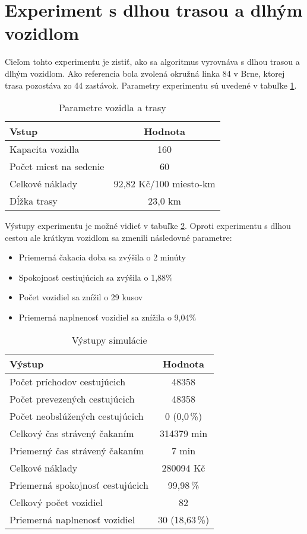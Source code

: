 \newpage
\section{Experiment s dlhou trasou a dlhým vozidlom}
Cieľom tohto experimentu je zistiť, ako sa algoritmus vyrovnáva s dlhou trasou a dlhým vozidlom.
Ako referencia bola zvolená okružná linka 84 v Brne, ktorej trasa pozostáva zo 44 zastávok.
Parametry experimentu sú uvedené v tabuľke \ref{tab:longDlongVin}.

\begin{table}[h]
  \centering
  \begin{tabular}{|l|c|}
    \hline
    \textbf{Vstup} & \textbf{Hodnota} \\ \hline
    Kapacita vozidla & 160 \\ \hline
    Počet miest na sedenie & 60 \\ \hline
    Celkové náklady & 92,82 Kč/100 miesto-km \\ \hline
    Dĺžka trasy & 23,0 km \\ \hline
  \end{tabular}
  \caption{Parametre vozidla a trasy}
  \label{tab:longDlongVin}
\end{table}

Výstupy experimentu je možné vidieť v tabuľke \ref{tab:longDlongVout}.
Oproti experimentu s dlhou cestou ale krátkym vozidlom sa zmenili následovné parametre:
\begin{itemize}
  \item Priemerná čakacia doba sa zvýšila o 2 minúty
  \item Spokojnosť cestiujúcich sa zvýšila o 1,88\%
  \item Počet vozidiel sa znížil o 29 kusov
  \item Priemerná naplnenosť vozidiel sa znížila o 9,04\%
\end{itemize}

\begin{table}[h]
  \centering
  \begin{tabular}{|l|c|}
    \hline
      \textbf{Výstup} & \textbf{Hodnota} \\ \hline
        Počet príchodov cestujúcich & 48358 \\ \hline
          Počet prevezených cestujúcich & 48358 \\ \hline
          Počet neobslúžených cestujúcich & 0 (0,0\,\%) \\ \hline
          Celkový čas strávený čakaním & 314379 min \\ \hline
          Priemerný čas strávený čakaním & 7 min \\ \hline
          Celkové náklady & 280094 Kč \\ \hline
          Priemerná spokojnosť cestujúcich & 99,98\,\% \\ \hline
          Celkový počet vozidiel & 82 \\ \hline
          Priemerná naplnenosť vozidiel & 30 (18,63\,\%) \\ \hline
  \end{tabular}
  \caption{Výstupy simulácie}
  \label{tab:longDlongVout}
\end{table}

